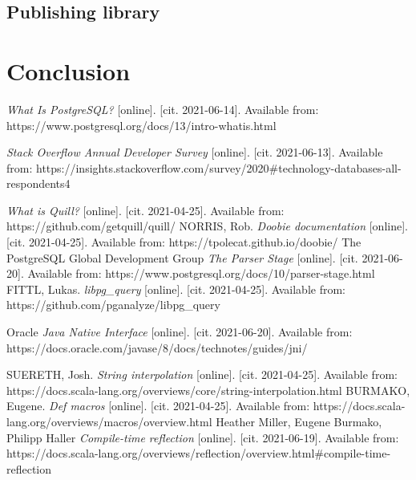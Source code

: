 \documentclass[thesis=B,english]{FITthesis}[2019/12/23]
\begin{document}
\section{Publishing library}

\chapter{Conclusion}




\begin{thebibliography}{9}

\textit {What Is PostgreSQL?} [online]. [cit. 2021-06-14]. Available from:
https://www.postgresql.org/docs/13/intro-whatis.html

\textit {Stack Overflow Annual Developer Survey} [online]. [cit. 2021-06-13]. Available from: https://insights.stackoverflow.com/survey/2020\#technology-databases-all-respondents4

\textit {What is Quill?} [online]. [cit. 2021-04-25]. Available from: https://github.com/getquill/quill/
NORRIS, Rob. 
\textit {Doobie documentation} [online]. [cit. 2021-04-25]. Available from: https://tpolecat.github.io/doobie/
The PostgreSQL Global Development Group
\textit{The Parser Stage} [online]. [cit. 2021-06-20]. Available from: https://www.postgresql.org/docs/10/parser-stage.html
FITTL, Lukas.
\textit {libpg\_query} [online]. [cit. 2021-04-25]. Available from:
https://github.com/pganalyze/libpg\_query

Oracle
\textit{Java Native Interface} [online]. [cit. 2021-06-20]. Available from:
https://docs.oracle.com/javase/8/docs/technotes/guides/jni/

SUERETH, Josh. 
\textit {String interpolation} [online]. [cit. 2021-04-25]. Available from: https://docs.scala-lang.org/overviews/core/string-interpolation.html
BURMAKO, Eugene. 
\textit {Def macros} [online]. [cit. 2021-04-25]. Available from: https://docs.scala-lang.org/overviews/macros/overview.html
Heather Miller, Eugene Burmako, Philipp Haller
\textit {Compile-time reflection} [online]. [cit. 2021-06-19]. Available from: https://docs.scala-lang.org/overviews/reflection/overview.html\#compile-time-reflection

\end{thebibliography}
\appendix
\end{document}
